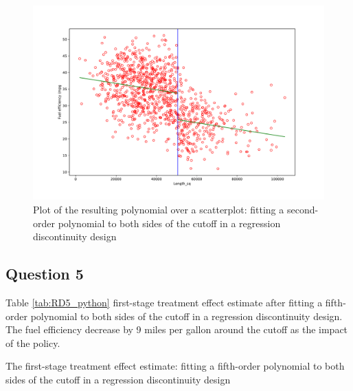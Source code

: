 \documentclass{article}
\begin{document}
\begin{figure}[ht]
    \centering
    \includegraphics[scale = 0.6]{discontinuity_4.pdf}
    \caption{Plot of the resulting polynomial over a scatterplot: fitting a second-order polynomial to both sides of the cutoff in a regression discontinuity design}
    \label{fig:discontinuity_4}
\end{figure}




\newpage

\subsection{Question 5 }



Table \ref{tab:RD5_python} first-stage treatment effect estimate after fitting a fifth-order polynomial to both sides of the cutoff in a regression discontinuity design. The fuel efficiency decrease by 9 miles per gallon around the cutoff as the impact of the policy.

\begin{table}[ht]
    \centering
    
    \caption{The first-stage treatment effect estimate: fitting a fifth-order polynomial to both sides of the cutoff in a regression discontinuity design}
    \label{tab:RD5_python}
\end{table}
\end{document}
